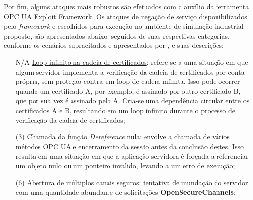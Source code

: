    Por fim, alguns ataques mais robustos são efetuados com o auxílio da ferramenta OPC UA Exploit Framework. Os ataques de negação de serviço disponibilizados pelo \textit{framework} e escolhidos para execução no ambiente de simulação industrial proposto, são apresentados abaixo, seguidos de suas respectivas categorias, conforme os cenários supracitados e apresentados por , e suas descrições:

    \begin{itemize}
        \item[N/A] \underline{Loop infinito na cadeia de certificados}: refere-se a uma situação em que algum servidor implementa a verificação da cadeia de certificados por conta própria, sem proteção contra um loop de cadeia infinita. Isso pode ocorrer quando um certificado A, por exemplo, é assinado por outro certificado B, que por sua vez é assinado pelo A. Cria-se uma dependência circular entre os certificados A e B, resultando em um loop infinito durante o processo de verificação da cadeia de certificados;
        \item[(3)] \underline{Chamada da função \textit{Dereference} nula}: envolve a chamada de vários métodos OPC UA e encerramento da sessão antes da conclusão destes. Isso resulta em uma situação em que a aplicação servidora é forçada a referenciar um objeto nulo ou um ponteiro invalido, levando a um erro de execução;
        \item[(6)] \underline{Abertura de múltiplos canais seguros}: tentativa de inundação do servidor com uma quantidade abundante de solicitações \textbf{OpenSecureChannels};

\end{itemize}
